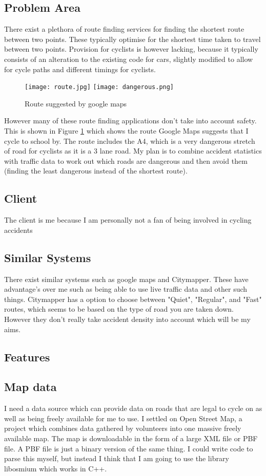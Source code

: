 \subsection{Problem Area}
There exist a plethora of route finding services for finding the shortest route between two points. These typically optimise for the shortest time taken to travel between two points. Provision for cyclists is however lacking, because it typically consists of an alteration to the existing code for cars, slightly modified to allow for cycle paths and different timings for cyclists.\\
\begin{figure}[t]
    \begin{center}
        \texttt{[image: route.jpg]}
    \texttt{[image: dangerous.png]}
\end{center}
    \caption{Route suggested by google maps}
    \label{route}
\end{figure}
However many of these route finding applications don't take into account safety. This is shown in Figure \ref{route} which shows the route Google Maps suggests that I cycle to school by. The route includes the A4, which is a very dangerous stretch of road for cyclists as it is a 3 lane road. 
My plan is to combine accident statistics with traffic data to work out which roads are dangerous and then avoid them (finding the least dangerous instead of the shortest route).
\subsection{Client}
The client is me because I am personally not a fan of being involved in cycling accidents
\subsection{Similar Systems}
There exist similar systems such as google maps and Citymapper. These have advantage's over me such as being able to use live traffic data and other such things. Citymapper has a option to choose between "Quiet", "Regular", and "Fast" routes, which seems to be based on the type of road you are taken down.
However they don't really take accident density into account which will be my aims.
\subsection{Features}
\subsection{Map data}
I need a data source which can provide data on roads that are legal to cycle on as well as being freely available for me to use. I settled on Open Street Map, a project which combines data gathered by volunteers into one massive freely available map. The map is downloadable in the form of a large XML file or PBF file. A PBF file is just a binary version of the same thing. I could write code to parse this myself, but instead I think that I am going to use the library libosmium
which works in C++.
